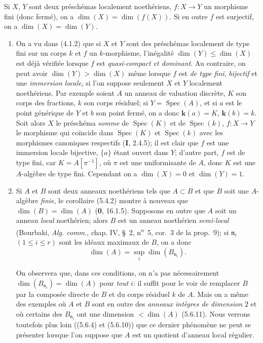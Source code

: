 \begin{corollary}[5.4.2]
\label{IV.2.s5.4.2-fr}
Si $X$, $Y$ sont deux préschémas localement noethériens, $f:X\to Y$ un
morphisme fini \textup{(donc} fermé\textup{)}, on a
$\dim(X)=\dim(f(X))$. Si en outre $f$ est surjectif, on a
$\dim(X)=\dim(Y)$.
\end{corollary}

\begin{remarks}[5.4.3]
\label{IV.2.s5.4.3-fr}
\begin{enumerate}
\item[(i)] On a vu dans (4.1.2) que si $X$ et $Y$ sont des préschémas
localement de type fini sur un corps $k$ et $f$ un $k$-morphisme, l'inégalité
$\dim(Y)\leq\dim(X)$ est déjà vérifiée lorsque $f$ est \emph{quasi-compact et
dominant}. Au contraire, on peut avoir $\dim(Y)>\dim(X)$ même lorsque $f$ est
\emph{de type fini}, \emph{bijectif} et une \emph{immersion locale}, si l'on suppose seulement
$X$ et $Y$ localement noethériens. Par exemple soient $A$ un anneau de
valuation discrète, $K$ son corps des fractions, $k$ son corps résiduel; si
$Y=\operatorname{Spec}(A)$, et si $a$ est le point générique de $Y$ et $b$
son point fermé, on a donc $\boldsymbol{k}(a)=K$, $\boldsymbol{k}(b)=k$. Soit alors $X$ le préschéma
\emph{somme} de $\operatorname{Spec}(K)$ et de $\operatorname{Spec}(k)$,
$f:X\to Y$ le morphisme qui coïncide dans $\operatorname{Spec}(K)$ et
$\operatorname{Spec}(k)$ avec les morphismes canoniques respectifs
(\textbf{I}, 2.4.5); il est clair que $f$ est une immersion locale bijective, $\{a\}$
étant ouvert dans $Y$; d'autre part, $f$ est de type fini, car
$K=A[\pi^{-1}]$, où $\pi$ est une uniformisante de $A$, donc $K$ est une
$A$-algèbre de type fini. Cependant on a $\dim(X)=0$ et $\dim(Y)=1$.

\item[(ii)] Si $A$ et $B$ sont deux anneaux noethériens tels que $A\subset B$
et que $B$ soit une $A$-algèbre \emph{finie}, le corollaire (5.4.2) montre à nouveau
que $\dim(B)=\dim(A)$ (\textbf{0}, 16.1.5). Supposons en outre que $A$ soit un anneau
\emph{local} noethérien; alors $B$ est un anneau noethérien \emph{semi-local} (Bourbaki,
\emph{Alg. comm.}, chap. IV, \S~2, n\textsuperscript{o}~5, cor.~3 de la
prop.~9); si $\mathfrak n_i$ $(1\leq i\leq r)$ sont les idéaux maximaux de
$B$, on a donc
\begin{equation}
\dim(A)=\sup_i\dim(B_{\mathfrak n_i}).
\tag{5.4.3.1}\label{IV.2.s5.4.3.1-fr}
\end{equation}

On observera que, dans ces conditions, on n'a pas nécessairement
$\dim(B_{\mathfrak n_i})=\dim(A)$ pour \emph{tout} $i$: il suffit pour le voir de
remplacer $B$ par la composée directe de $B$ et du corps résiduel $k$ de
$A$. Mais on a même des exemples où $A$ et $B$ sont en outre des \emph{anneaux
intègres de dimension} $2$ et où certains des $B_{\mathfrak n_i}$ ont une
dimension $<\dim(A)$ (5.6.11). Nous verrons toutefois plus loin ((5.6.4) et
(5.6.10)) que ce dernier phénomène ne peut se présenter lorsque l'on suppose
que $A$ est un quotient d'anneau local régulier.
\end{enumerate}
\end{remarks}


